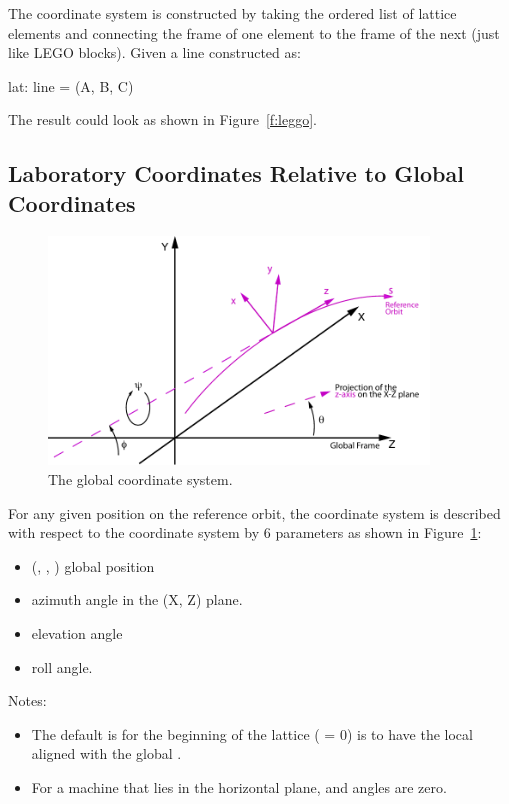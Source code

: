 \documentclass{hitec}
\begin{document}
The  coordinate system is constructed by taking the ordered list of lattice elements and
connecting the  frame of one element to the  frame of the next (just like LEGO
blocks). Given a line constructed as:
\begin{code}
    lat: line = (A, B, C)
\end{code}
The result could look as shown in Figure~\ref{f:leggo}.

\subsection{Laboratory Coordinates Relative to Global Coordinates}

\begin{figure}[tb]
  \centering
  \includegraphics[width=0.9\textwidth]{global-coords.pdf}
  \caption{The global coordinate system.}
  \label{f:global}
\end{figure}

For any given position on the reference orbit, the  coordinate system is described with
respect to the  coordinate system by 6 parameters as shown in Figure~\ref{f:global}:
\begin{itemize}
\item (, , ) global position
\item \vn{$\theta$} azimuth angle in the (X, Z) plane.
\item \vn{$\phi$} elevation angle
\item \vn{$\psi$} roll angle.
\end{itemize}

Notes:
\begin{itemize}
\item The default is for the beginning of the lattice ( = 0) is to have the local  aligned with the 
global .
\item For a machine that lies in the horizontal plane, \vn{$\phi$} and \vn{$\psi$} angles are zero.
\end{itemize}
\end{document}
